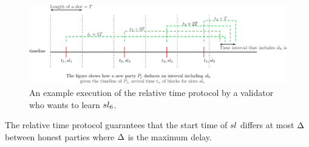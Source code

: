 \begin{figure}[h]
	\centering
	\includegraphics[width=1.\textwidth]{images/relative.png}
	\caption{An example execution of the relative time protocol by a validator who wants to learn $ sl_{6} $.}
	\label{fig:relativetime}
\end{figure}

The relative time protocol guarantees that the start time of $ sl $ differs at most $ \Delta $ between honest parties where $ \Delta $ is the maximum delay.